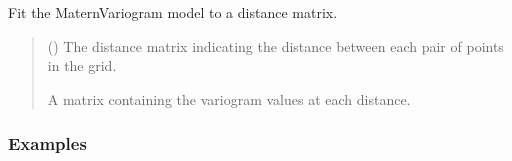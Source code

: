 \documentclass[letterpaper,10pt,english]{sphinxmanual}
\begin{document}
\begin{fulllineitems}
\begin{fulllineitems}
\label{\detokenize{covariance:glomar_gridding.variogram.MaternVariogram.fit}}
\pysigstartsignatures
\pysiglinewithargsret
{}
{}
{}
\pysigstopsignatures
\sphinxAtStartPar
Fit the MaternVariogram model to a distance matrix.
\begin{quote}\begin{description}
\sphinxAtStartPar
{} () \textendash{} The distance matrix indicating the distance between each pair of
points in the grid.

\sphinxAtStartPar
A matrix containing the variogram values at each distance.

\sphinxAtStartPar
{}

\end{description}\end{quote}
\subsubsection*{Examples}

\begin{sphinxVerbatim}[commandchars=\\\{\}]
\end{sphinxVerbatim}

\end{fulllineitems}


\end{fulllineitems}

\end{document}
